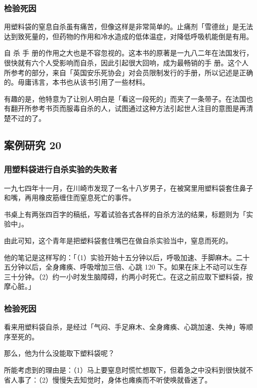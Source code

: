\documentclass[UTF8]{ctexart}
\begin{document}
\subsubsection*{检验死因}

用塑料袋的窒息自杀虽有痛苦，但像这样是非常简单的。止痛剂「雪德丝」是无法达到致死量的，但药物的作用和冷水造成的低体温症，对降低呼吸机能倒是有用。

自
杀
手
册的作用之大也是不容忽视的。这本书的原著是一九八二年在法国发行，很快就有六个人受影响而自杀，因此引起很大回响，成为最畅销的手
册。这个人所参考的部分，来自「英国安乐死协会」对会员限制发行的手册，所以记述是正确的。毋庸讳言，本书也从该书引用了一些材料。

有趣的是，他特意为了让别人明白是「看这一段死的」而夹了一条带子。在法国也有翻开所参考书页而服毒自杀的人，试图通过这种方法引起世人注目的意图是再清楚不过的了。

\subsection{案例研究 20}

\subsubsection*{用塑料袋进行自杀实验的失败者}

一九七四年十一月，在川崎市发现了一名十八岁男子，在被窝里用塑料袋套住鼻子和嘴，再用橡皮筋缠住而窒息死亡的事件。

书桌上有两张四百字的稿纸，写着试验各式各样的自杀方法的结果，标题则为「实验中」。

由此可知，这个青年是把塑料袋套住嘴巴在做自杀实验当中，窒息而死的。

他的笔记是这样写的：「（1）实验开始十五分钟以后，呼吸加速、手脚麻木。二十五分钟以后，全身瘫痪、呼吸增加三倍、心跳 120 下。如果在床上不动可以生存三十分钟。（2）约一小时发生脑障碍，约两小时死亡。在这之前应取下塑料袋，按摩心脏。」

\subsubsection*{检验死因}

看来用塑料袋自杀，是经过「气闷、手足麻木、全身瘫痪、心跳加速、失神」等顺序至死的。

那么，他为什么没能取下塑料袋呢？

所能考虑到的理由是：（1）马上要窒息时慌忙想取下，但着急之中没料到很快就不省人事了：（2）慢慢失去知觉时，身体也瘫痪而不听使唤就昏迷了。
\end{document}
